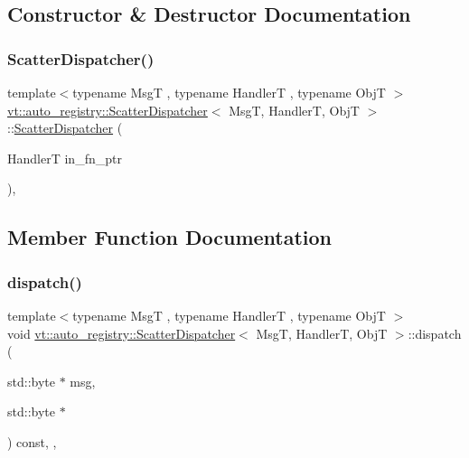 \subsection{Constructor \& Destructor Documentation}
\mbox{\label{structvt_1_1auto__registry_1_1_scatter_dispatcher_a1059ed7e28fe51d138a6945593dce385}} 
\subsubsection{\texorpdfstring{Scatter\+Dispatcher()}{ScatterDispatcher()}}
{\footnotesize\ttfamily template$<$typename MsgT , typename HandlerT , typename ObjT $>$ \\
\hyperlink{structvt_1_1auto__registry_1_1_scatter_dispatcher}{vt\+::auto\+\_\+registry\+::\+Scatter\+Dispatcher}$<$ MsgT, HandlerT, ObjT $>$\+::\hyperlink{structvt_1_1auto__registry_1_1_scatter_dispatcher}{Scatter\+Dispatcher} (\begin{DoxyParamCaption}\item[{HandlerT}]{in\+\_\+fn\+\_\+ptr }\end{DoxyParamCaption})\hspace{0.3cm}{\ttfamily [inline]}, {\ttfamily [explicit]}}



\subsection{Member Function Documentation}
\mbox{\label{structvt_1_1auto__registry_1_1_scatter_dispatcher_a1be99f3b95f4573106bd4bee68c8fd96}} 
\subsubsection{\texorpdfstring{dispatch()}{dispatch()}}
{\footnotesize\ttfamily template$<$typename MsgT , typename HandlerT , typename ObjT $>$ \\
void \hyperlink{structvt_1_1auto__registry_1_1_scatter_dispatcher}{vt\+::auto\+\_\+registry\+::\+Scatter\+Dispatcher}$<$ MsgT, HandlerT, ObjT $>$\+::dispatch (\begin{DoxyParamCaption}\item[{std\+::byte $\ast$}]{msg,  }\item[{std\+::byte $\ast$}]{ }\end{DoxyParamCaption}) const\hspace{0.3cm}{\ttfamily [inline]}, {\ttfamily [override]}, {\ttfamily [virtual]}}



